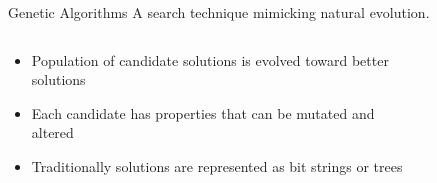 \begin{frame}{Genetic Algorithms}
A search technique mimicking natural evolution.
\begin{columns}[onlytextwidth]
  \begin{column}{0.45\textwidth}
    \small
    \begin{itemize}
      \item Population of candidate solutions is evolved toward better solutions
      \item Each candidate has properties that can be mutated and altered
      \item Traditionally solutions are represented as bit strings or trees
    \end{itemize}
    \end{column}
  \begin{column}{0.45\textwidth}
    \begin{figure}
		\tiny
		\begin{algorithmic}
        \ENDFOR
        \ENDFOR
      \ENDWHILE
    \end{algorithmic}
    \end{figure}
  \end{column}
\end{columns}
\hyperlink{GAMethod}{}
\hyperlink{toc}{}
\end{frame}
